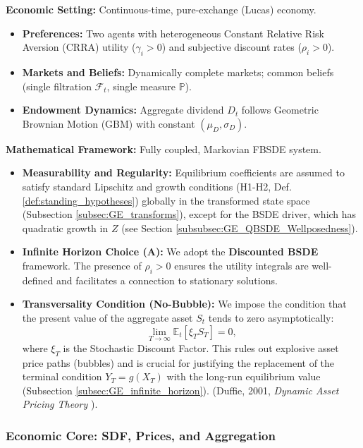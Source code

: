 \documentclass[11pt,letterpaper,oneside]{article}
\theoremstyle{plain}
\theoremstyle{definition}
\theoremstyle{remark}
\begin{document}
\begin{tcolorbox}[colback=blue!5!white, colframe=blue!75!black, title={Assumptions \& Scope (Two-Agent GE FBSDE)}]
\textbf{Economic Setting:} Continuous-time, pure-exchange (Lucas) economy.
\begin{itemize}[leftmargin=1.2em, itemsep=2pt]
    \item \textbf{Preferences:} Two agents with heterogeneous Constant Relative Risk Aversion (CRRA) utility ($\gamma_i>0$) and subjective discount rates ($\rho_i>0$).
    \item \textbf{Markets and Beliefs:} Dynamically complete markets; common beliefs (single filtration $\mathcal{F}_t$, single measure $\mathbb{P}$).
    \item \textbf{Endowment Dynamics:} Aggregate dividend $D_t$ follows Geometric Brownian Motion (GBM) with constant $(\mu_D, \sigma_D)$.
\end{itemize}
\textbf{Mathematical Framework:} Fully coupled, Markovian FBSDE system.
\begin{itemize}[leftmargin=1.2em, itemsep=2pt]
    \item \textbf{Measurability and Regularity:} Equilibrium coefficients are assumed to satisfy standard Lipschitz and growth conditions (H1-H2, Def. \ref{def:standing_hypotheses}) globally in the transformed state space (Subsection \ref{subsec:GE_transforms}), except for the BSDE driver, which has quadratic growth in $Z$ (see Section \ref{subsubsec:GE_QBSDE_Wellposedness}).
    \item \textbf{Infinite Horizon Choice (A):} We adopt the \textbf{Discounted BSDE} framework. The presence of $\rho_i>0$ ensures the utility integrals are well-defined and facilitates a connection to stationary solutions.
    \item \textbf{Transversality Condition (No-Bubble):} We impose the condition that the present value of the aggregate asset $S_t$ tends to zero asymptotically:
    \[
        \lim_{T\to\infty} \mathbb{E}_t\left[ \xi_T S_T \right] = 0,
    \]
    where $\xi_T$ is the Stochastic Discount Factor. This rules out explosive asset price paths (bubbles) and is crucial for justifying the replacement of the terminal condition $Y_T=g(X_T)$ with the long-run equilibrium value (Subsection \ref{subsec:GE_infinite_horizon}). (Duffie, 2001, \emph{Dynamic Asset Pricing Theory} \cite{Duffie2001}).
\end{itemize}
\end{tcolorbox}

\subsubsection{Economic Core: SDF, Prices, and Aggregation}
\end{document}

